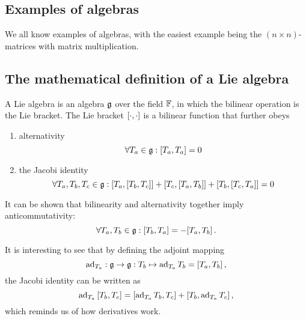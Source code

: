     \subsection{Examples of algebras}
        We all know examples of algebras, with the easiest example being the $(n \times n)$-matrices with matrix multiplication. \\

    \subsection{The mathematical definition of a Lie algebra}
        A Lie algebra is an algebra $\operatorname{\mathfrak{g}}$ over the field $\mathbb{F}$, in which the bilinear operation is the Lie bracket. The Lie bracket $\comm{\cdot}{\cdot}$ is a bilinear function that further obeys
        \begin{enumerate}
            \item alternativity
            \begin{equation}
                \forall T_a \in \glie: \comm{T_a}{T_a} = 0
            \end{equation}

            \item the Jacobi identity
            \begin{equation}
                \forall T_a, T_b, T_c \in \glie: \comm{T_a}{\comm{T_b}{T_c}} + \comm{T_c}{\comm{T_a}{T_b}} + \comm{T_b}{\comm{T_c}{T_a}} = 0
            \end{equation}
        \end{enumerate}

        It can be shown that bilinearity and alternativity together imply anticommutativity:
        \begin{equation}
            \forall T_a, T_b \in \glie: \comm{T_b}{T_a} = - \comm{T_a}{T_b} \thinspace .
        \end{equation}

        It is interesting to see that by defining the adjoint mapping
        \begin{equation}
            \ad_{T_a}: \glie \to \glie: T_b \mapsto \ad_{T_a} T_b = \comm{T_a}{T_b} \thinspace ,
        \end{equation}
        the Jacobi identity can be written as
        \begin{equation}
            \ad_{T_a} \comm{T_b}{T_c} = \comm{\ad_{T_a} T_b}{T_c} + \comm{T_b}{\ad_{T_a} T_c} \thinspace ,
        \end{equation}
        which reminds us of how derivatives work. \\

